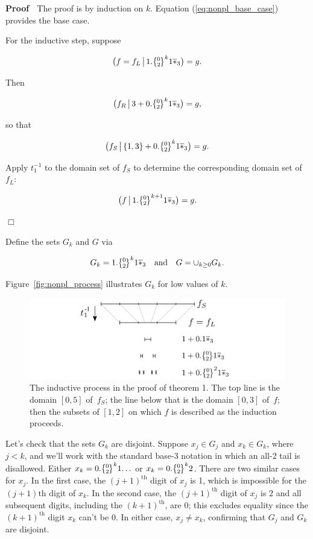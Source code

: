 \documentclass[20pt,]{extarticle}
\begin{document}
\textbf{Proof} \(\;\) The proof is by induction on \(k\). Equation
(\ref{eq:nonpl_base_case}) provides the base case.

For the inductive step, suppose

\[\big(f=f_L \restrict 1.\zerotwo^k1\lstar \big) = g.\]

Then

\[\big(f_R \restrict 3 + 0.\zerotwo^k1\lstar \big) = g,\]

so that

\[\big(f_S \restrict \{1,3\} + 0.\zerotwo^k1\lstar \big) = g.\]

Apply \(t_1^{-1}\) to the domain set of \(f_S\) to determine the
corresponding domain set of \(f_L\):

\[\big(f \restrict 1.\zerotwo^{k+1}1\lstar \big) = g.\]

\hfill\(\Box\)

Define the sets \(G_k\) and \(G\) via

\begin{equation}G_k = 1.\zerotwo^k1\lstar \quad\text{and}\quad
  G = \cup_{k \ge 0}G_k.\label{eq:Gk_G}\end{equation}

Figure~\ref{fig:nonpl_process} illustrates \(G_k\) for low values of
\(k\).

\begin{figure}[htbp]
\centering
\includegraphics{images/nonpl_process.png}
\caption{\label{fig:nonpl_process}The inductive process in the proof of
theorem 1. The top line is the domain \([0,5]\) of \(\,f_S\); the line
below that is the domain \([0,3]\) of \(\,f;\) then the subsets of
\([1,2]\) on which \(f\) is described as the induction
proceeds.}\label{fig:nonplux5fprocess}
\end{figure}

Let's check that the sets \(G_k\) are disjoint. Suppose \(x_j\in G_j\)
and \(x_k\in G_k\), where \(j < k\), and we'll work with the standard
base-3 notation in which an all-2 tail is disallowed. Either
\(x_k=0.\zerotwo^k1\!\ldots\) or \(x_k=0.\zerotwo^k2\). There are two
similar cases for \(x_j\). In the first case, the \((j+1)^\text{th}\)
digit of \(x_j\) is 1, which is impossible for the \((j+1)\text{th}\)
digit of \(x_k\). In the second case, the \((j+1)^\text{th}\) digit of
\(x_j\) is 2 and all subsequent digits, including the
\((k+1)^\text{th}\), are 0; this excludes equality since the
\((k+1)^\text{th}\) digit \(x_k\) can't be 0. In either case,
\(x_j\ne x_k\), confirming that \(G_j\) and \(G_k\) are disjoint.
\end{document}
